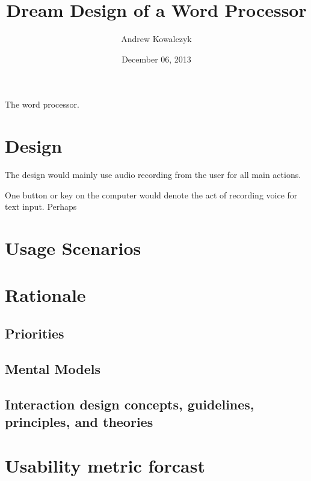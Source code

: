 \documentclass[11pt, oneside]{article}
\title{Dream Design of a Word Processor}
\author{Andrew Kowalczyk}
\date{December 06, 2013}
\begin{document}
\maketitle
The word processor.

\section{Design}

The design would mainly use audio recording from the user for all main actions.

One button or key on the computer would denote the act of recording voice for text input. Perhaps 


\section{Usage Scenarios}

\section{Rationale}

\subsection{Priorities}
\subsection{Mental Models}
\subsection{Interaction design concepts, guidelines, principles, and theories}

\cmdkey


\section{Usability metric forcast}
\end{document}
